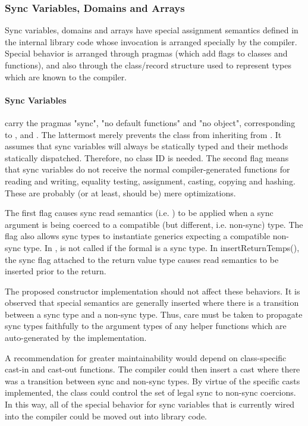 \subsubsection{Sync Variables, Domains and Arrays} 

Sync variables, domains and arrays have special assignment semantics defined
in the internal library code whose invocation is arranged specially by the
compiler.  Special behavior is arranged through pragmas (which add flags to classes and
functions), and also through the class/record structure used to represent types
which are known to the compiler.  

\paragraph{Sync Variables} carry the pragmas "sync", "no default functions" and "no object",
corresponding to ,  and .  The
lattermost merely prevents the  class from inheriting from .  It
assumes that sync variables will always be statically typed and their methods
statically dispatched.  Therefore, no class ID is needed.  The second flag means
that sync variables do not receive the normal compiler-generated functions for
reading and writing, equality testing, assignment, casting, copying and
hashing.  These are probably (or at least, should be) mere optimizations.

The first flag causes sync read semantics (i.e. ) to be applied
when a sync argument is being coerced to a compatible (but different,
i.e. non-sync) type.  The flag also allows sync types to instantiate generics
expecting a compatible non-sync type.  In ,  is
not called if the formal is a sync type.  In insertReturnTemps(), the sync flag
attached to the return value type causes read semantics to be inserted prior to
the return.

The proposed constructor implementation should not affect these behaviors.  It is
observed that special semantics are generally inserted where there is a
transition between a sync type and a non-sync type.  Thus, care must be taken to
propagate sync types faithfully to the argument types of any helper functions
which are auto-generated by the implementation.  

A recommendation for greater maintainability would depend on class-specific
cast-in and cast-out functions.  The compiler could then insert a cast where
there was a transition between sync and non-sync types.  By virtue of the
specific casts implemented, the class could control the set of legal sync to
non-sync coercions.  In this way, all of the special behavior for sync variables
that is currently wired into the compiler could be moved out into library code.

